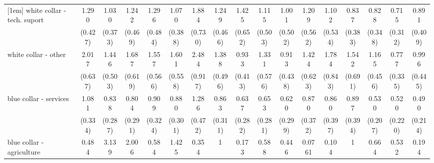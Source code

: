 {\begin{tabular}{l*{16}{c}}
[1em]
white collar - tech. suport&       1.290         &       1.030         &       1.242         &       1.296         &       1.070         &       1.884         &       1.249         &       1.425         &       1.115         &       1.001         &       1.209         &       1.102         &       0.837         &       0.828         &       0.715         &       0.891         \\
                    &     (0.427)         &     (0.373)         &     (0.469)         &     (0.484)         &     (0.388)         &     (0.730)         &     (0.466)         &     (0.652)         &     (0.503)         &     (0.502)         &     (0.562)         &     (0.534)         &     (0.383)         &     (0.348)         &     (0.312)         &     (0.409)         \\
[1em]
white collar - other&       2.017\sym{*}  &       1.446         &       1.687         &       1.557         &       1.601         &       2.484\sym{*}  &       1.388         &       0.933         &       1.331         &       0.913         &       1.424         &       1.784         &       1.542         &       1.165         &       0.777         &       0.996         \\
                    &     (0.637)         &     (0.503)         &     (0.619)         &     (0.566)         &     (0.558)         &     (0.917)         &     (0.496)         &     (0.413)         &     (0.576)         &     (0.438)         &     (0.623)         &     (0.843)         &     (0.691)         &     (0.456)         &     (0.335)         &     (0.445)         \\
[1em]
blue collar - services&       1.081         &       0.838         &       0.804         &       0.909         &       0.880         &       1.286         &       0.863         &       0.637         &       0.653         &       0.620         &       0.870         &       0.860         &       0.897         &       0.530         &       0.520         &       0.490         \\
                    &     (0.334)         &     (0.287)         &     (0.291)         &     (0.324)         &     (0.301)         &     (0.472)         &     (0.311)         &     (0.282)         &     (0.281)         &     (0.299)         &     (0.372)         &     (0.397)         &     (0.394)         &     (0.207)         &     (0.220)         &     (0.214)         \\
[1em]
blue collar - agriculture&       0.484         &       3.139         &       2.006         &       0.584         &       1.425         &       0.354         &           1         &       0.173         &       0.588         &       0.446         &      0.0761\sym{*}  &       0.104         &           1         &       0.664         &       0.532         &       0.194         \\

\end{tabular}}

